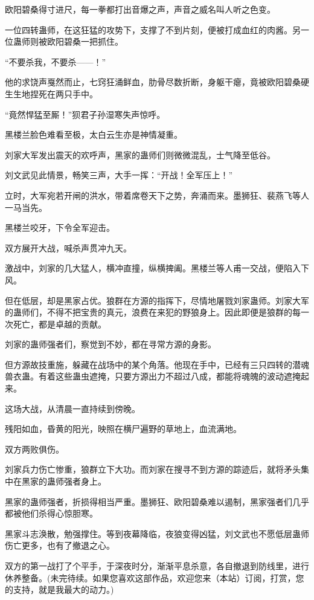 \begin{this_body}
欧阳碧桑得寸进尺，每一拳都打出音爆之声，声音之威名叫人听之色变。

一位四转蛊师，在这狂猛的攻势下，支撑了不到片刻，便被打成血红的肉酱。另一位蛊师则被欧阳碧桑一把抓住。

“不要杀我，不要杀——！”

他的求饶声戛然而止，七窍狂涌鲜血，肋骨尽数折断，身躯干瘪，竟被欧阳碧桑硬生生地捏死在两只手中。

“竟然悍猛至厮！”狈君子孙湿寒失声惊呼。

黑楼兰脸色难看至极，太白云生亦是神情凝重。

刘家大军发出震天的欢呼声，黑家的蛊师们则微微混乱，士气降至低谷。

刘文武见此情景，畅笑三声，大手一挥：“开战！全军压上！”

立时，大军宛若开闸的洪水，带着席卷天下之势，奔涌而来。墨狮狂、裴燕飞等人一马当先。

黑楼兰咬牙，下令全军迎击。

双方展开大战，喊杀声贯冲九天。

激战中，刘家的几大猛人，横冲直撞，纵横捭阖。黑楼兰等人甫一交战，便陷入下风。

但在低层，却是黑家占优。狼群在方源的指挥下，尽情地屠戮刘家蛊师。刘家大军的蛊师们，不得不把宝贵的真元，浪费在来犯的野狼身上。因此即便是狼群的每一次死亡，都是卓越的贡献。

刘家的蛊师强者们，察觉到不妙，都在寻常方源的身影。

但方源故技重施，躲藏在战场中的某个角落。他现在手中，已经有三只四转的潜魂兽衣蛊。有着这些蛊虫遮掩，只要方源出力不超过八成，都能将魂魄的波动遮掩起来。

这场大战，从清晨一直持续到傍晚。

残阳如血，昏黄的阳光，映照在横尸遍野的草地上，血流满地。

双方两败俱伤。

刘家兵力伤亡惨重，狼群立下大功。而刘家在搜寻不到方源的踪迹后，就将矛头集中在黑家的蛊师强者身上。

黑家的蛊师强者，折损得相当严重。墨狮狂、欧阳碧桑难以遏制，黑家强者们几乎都被他们杀得心惊胆寒。

黑家斗志涣散，勉强撑住。等到夜幕降临，夜狼变得凶猛，刘文武也不愿低层蛊师伤亡更多，也有了撤退之心。

双方的第一战打了个平手，于深夜时分，渐渐平息杀意，各自撤退到防线里，进行休养整备。(未完待续。如果您喜欢这部作品，欢迎您来（本站）订阅，打赏，您的支持，就是我最大的动力。)

\end{this_body}

